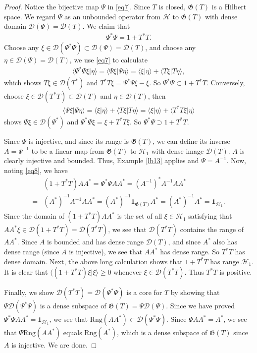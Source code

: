 \documentclass[12pt,a4paper,notitlepage]{article}
\theoremstyle{definition}
\theoremstyle{plain}
\newcommand{\fk}{\mathfrak}
\newcommand{\mc}{\mathcal}
\newcommand{\id}{\mathbf{1}}
\newcommand{\Dom}{\scr D}
\newcommand{\bk}[1]{\langle {#1}\rangle}
\newcommand{\scr}{\mathscr}
\newcommand{\Rng}{\mathrm{Rng}}
\numberwithin{equation}{section}
\begin{document}
\begin{proof}
Notice the bijective map $\Psi$ in \eqref{eq7}. Since $T$ is closed, $\fk G(T)$ is a Hilbert space. We regard $\Psi$ as an unbounded operator from $\mc H$ to  $\fk G(T)$ with dense domain $\Dom(\Psi)=\Dom(T)$.  We claim that
\begin{align}
\Psi^*\Psi=1+T^*T.	
\end{align}
Choose any $\xi\in\Dom(\Psi^*\Psi)\subset\Dom(\Psi)=\Dom(T)$, and choose any $\eta\in\Dom(\Psi)=\Dom(T)$, we use \eqref{eq7} to calculate
\begin{align*}
\bk{\Psi^*\Psi\xi|\eta}=\bk{\Psi\xi|\Psi\eta}=\bk{\xi|\eta}+\bk{T\xi|T\eta},
\end{align*}
which shows $T\xi\in\Dom(T^*)$ and $T^*T\xi=\Psi^*\Psi\xi-\xi$. So $\Psi^*\Psi\subset 1+T^*T$. Conversely, choose $\xi\in\Dom(T^*T)\subset\Dom(T)$ and $\eta\in\Dom(T)$, then 
\begin{align*}
\bk{\Psi\xi|\Psi\eta}=\bk{\xi|\eta}+\bk{T\xi|T\eta}=\bk{\xi|\eta}+\bk{T^*T\xi|\eta}	
\end{align*}
shows $\Psi\xi\in\Dom(\Psi^*)$ and $\Psi^*\Psi\xi=\xi+T^*T\xi$. So $\Psi^*\Psi\supset 1+T^*T$.

Since $\Psi$ is injective, and since its range is $\fk G(T)$, we can define its inverse $A=\Psi^{-1}$ to be a linear map from $\fk G(T)$ to $\mc H_1$ with dense image $\Dom(T)$. $A$ is clearly injective and bounded. Thus, Example \ref{lb13} applies and $\Psi=A^{-1}$.  Now, noting \eqref{eq8}, we have
\begin{align*}
&(1+T^*T)AA^*=\Psi^*\Psi AA^*=(A^{-1})^*A^{-1}AA^*\\
=&(A^*)^{-1}A^{-1}AA^*=	(A^*)^{-1}\id_{\fk G(T)} A^*=(A^*)^{-1}A^*=\id_{\mc H_1}.
\end{align*}
Since the domain of $(1+T^*T)AA^*$ is the set of all $\xi\in\mc H_1$ satisfying that $AA^*\xi\in\Dom(1+T^*T)=\Dom(T^*T)$, we see that $\Dom(T^*T)$ contains the range of $AA^*$. Since $A$ is bounded and has dense range $\Dom(T)$, and since $A^*$ also has dense range (since $A$ is injective), we see that $AA^*$ has dense range. So $T^*T$ has dense domain. Next, the above long calculation shows that $1+T^*T$ has range $\mc H_1$. It is clear that $\bk{(1+T^*T)\xi|\xi}\geq 0$ whenever $\xi\in\Dom(T^*T)$. Thus $T^*T$ is positive.

Finally, we show $\Dom(T^*T)=\Dom(\Psi^*\Psi)$ is a core for $T$ by showing that $\Psi\Dom(\Psi^*\Psi)$ is a dense subspace of $\fk G(T)=\Psi\Dom(\Psi)$. Since we have proved $\Psi^*\Psi AA^*=\id_{\mc H_1}$, we see that $\Rng(AA^*)\subset\Dom(\Psi^*\Psi)$. Since $\Psi AA^*=A^*$, we see that $\Psi\Rng(AA^*)$ equals $\Rng(A^*)$, which is a dense subspace of $\fk G(T)$ since $A$ is injective. We are done.
\end{proof}
\end{document}
